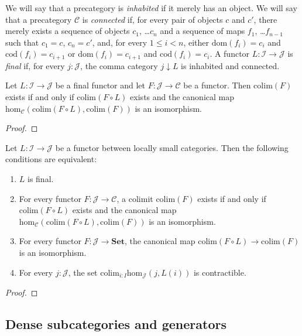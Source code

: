 \documentclass[reqno]{amsart}
\theoremstyle{definition}
\theoremstyle{remark}
\newcommand{\fs}[1]{\mathrm{#1}}
\newcommand{\cat}[1]{\mathbf{#1}}
\newcommand{\scat}[1]{\mathcal{#1}}
\renewcommand{\hom}{\fs{hom}}
\newcommand{\Set}{\cat{Set}}
\numberwithin{figure}{section}
\begin{document}
We will say that a precategory is \emph{inhabited} if it merely has an object.
We will say that a precategory $\scat{C}$ is \emph{connected} if, for every pair of objects $c$ and $c'$, there merely exists a sequence of objects $c_1$, \ldots $c_n$ and a sequence of maps $f_1$, \ldots $f_{n-1}$
such that $c_1 = c$, $c_n = c'$, and, for every $1 \leq i < n$, either $\fs{dom}(f_i) = c_i$ and $\fs{cod}(f_i) = c_{i+1}$ or $\fs{dom}(f_i) = c_{i+1}$ and $\fs{cod}(f_i) = c_i$.
A functor $L : \scat{I} \to \scat{J}$ is \emph{final} if, for every $j : \scat{J}$, the comma category $j \downarrow L$ is inhabited and connected.

\begin{lem}
Let $L : \scat{I} \to \scat{J}$ be a final functor and let $F : \scat{J} \to \scat{C}$ be a functor.
Then $\fs{colim}(F)$ exists if and only if $\fs{colim}(F \circ L)$ exists and the canonical map $\hom_\scat{C}(\fs{colim}(F \circ L),\fs{colim}(F))$ is an isomorphism.
\end{lem}
\begin{proof}
\end{proof}

\begin{prop}
Let $L : \scat{I} \to \scat{J}$ be a functor between locally small categories.
Then the following conditions are equivalent:
\begin{enumerate}
\item $L$ is final.
\item For every functor $F : \scat{J} \to \scat{C}$, a colimit $\fs{colim}(F)$ exists if and only if $\fs{colim}(F \circ L)$ exists and the canonical map $\hom_\scat{C}(\fs{colim}(F \circ L),\fs{colim}(F))$ is an isomorphism.
\item For every functor $F : \scat{J} \to \Set$, the canonical map $\fs{colim}(F \circ L) \to \fs{colim}(F)$ is an isomorphism.
\item For every $j : \scat{J}$, the set $\fs{colim}_{i : I} \hom_\scat{J}(j,L(i))$ is contractible.
\end{enumerate}
\end{prop}
\begin{proof}
\end{proof}


\subsection{Dense subcategories and generators}
\end{document}
